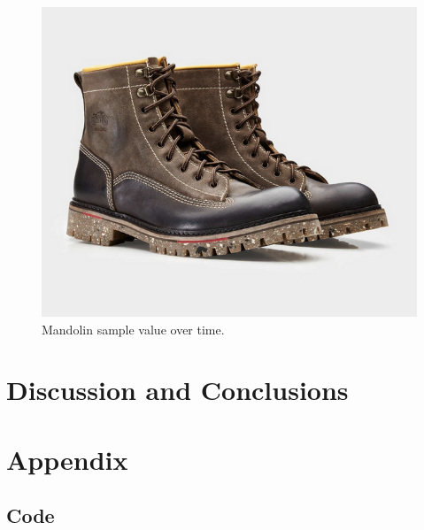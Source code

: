 \documentclass{article}
\begin{document}
        \begin{figure}[h]
            \includegraphics[scale=0.25]{images/placeholder.png}%
            \centering
            \caption{Mandolin sample value over time.}
            \label{specWaterfallMando2}
        \end{figure}

\section{Discussion and Conclusions}
\section{Appendix}
\subsection{Code}





\end{document}

